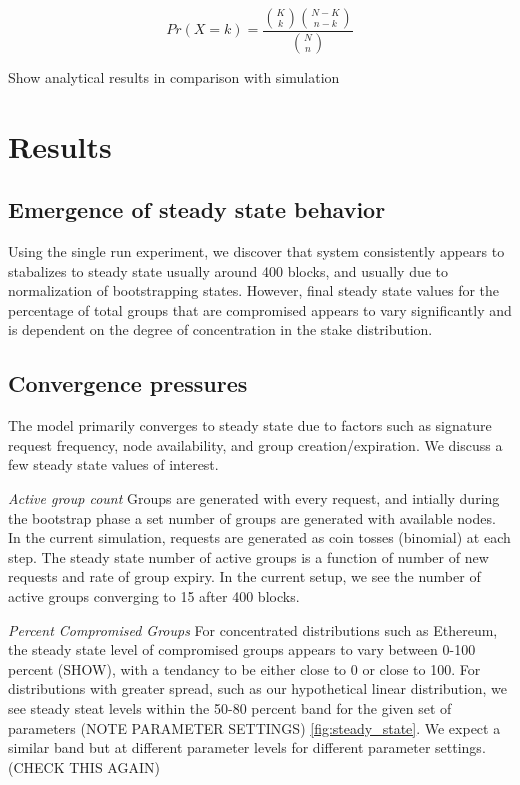 \documentclass[conference]{IEEEtran}
\begin{document}
\begin{equation}
    Pr(X = k) = \frac{{K \choose k} {N-K\choose n-k}}{{N \choose n}}
\end{equation}

Show analytical results in comparison with simulation


\section{Results}
\subsection{Emergence of steady state behavior}
Using the single run experiment, we discover that system consistently appears to 
stabalizes to steady state usually around 400 blocks, and usually due to normalization of bootstrapping states. 
However, final steady state values for the percentage of total groups that are compromised
appears to vary significantly and is dependent on the degree of concentration in the 
stake distribution. 

\subsection{Convergence pressures}

The model primarily converges to steady state due to factors such as
signature request frequency, node availability, and group creation/expiration. We discuss a few
steady state values of interest.

\textit{Active group count} Groups are generated with every request, and intially
during the bootstrap phase a set number of groups are generated with available nodes. In the current
simulation, requests are generated as coin tosses (binomial) at each step. The steady state number of 
active groups is a function of number of new requests and rate of group expiry. In the current setup, 
we see the number of active groups converging to 15 after 400 blocks.

\textit{Percent Compromised Groups} For concentrated distributions such as Ethereum, the steady state level of compromised
groups appears to vary between 0-100 percent (SHOW), with a tendancy to be either close
to 0 or close to 100. For distributions with greater spread, such as our hypothetical linear
distribution, we see steady steat levels within the 50-80 percent band for the given set
of parameters (NOTE PARAMETER SETTINGS) \ref{fig:steady_state}. We expect a similar band but at
different parameter levels for different parameter settings. (CHECK THIS AGAIN)
\end{document}
